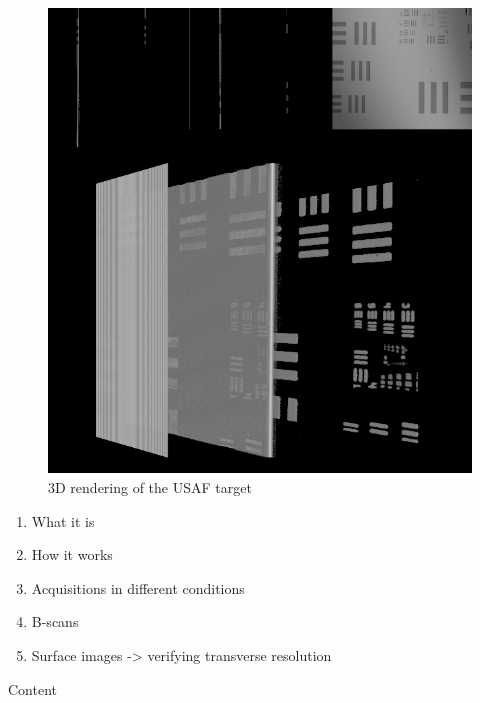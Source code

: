     \begin{figure}[hbt]
        \centering
        \includegraphics[width=1\linewidth]{gfx/3d/target}
        \caption[]{3D rendering of the USAF target}\label{fig:targer-3d}
    \end{figure}

	\begin{enumerate}
		\item What it is
		\item How it works
		\item Acquisitions in different conditions
		\item B-scans
		\item Surface images -> verifying transverse resolution
	\end{enumerate}

Content
